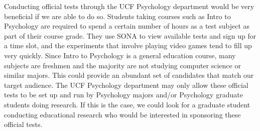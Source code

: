 Conducting official tests through the UCF Psychology department would be very beneficial if we are able to do so. Students taking courses such as Intro to Psychology are required to spend a certain number of hours as a test subject as part of their course grade. They use SONA to view available tests and sign up for a time slot, and the experiments that involve playing video games tend to fill up very quickly. Since Intro to Psychology is a general education course, many subjects are freshmen and the majority are not studying computer science or similar majors. This could provide an abundant set of candidates that match our target audience. The UCF Psychology department may only allow these official tests to be set up and run by Psychology majors and/or Psychology graduate students doing research. If this is the case, we could look for a graduate student conducting educational research who would be interested in sponsoring these official tests.\\